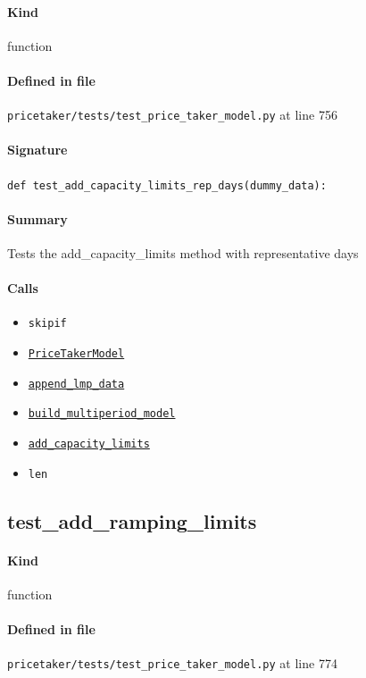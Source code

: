 \documentclass[11pt]{report}
\begin{document}
\paragraph{Kind} function
\paragraph{Defined in file} \texttt{pricetaker/tests/test\_price\_taker\_model.py} at line 756
\paragraph{Signature} \texttt{def test\_add\_capacity\_limits\_rep\_days(dummy\_data):}
\paragraph{Summary} Tests the add\_capacity\_limits method with representative days
\paragraph{Calls}
\begin{itemize}[leftmargin=*]
  \item \texttt{skipif}
  \item \hyperref[def:pricetaker-price_taker_model.py:PriceTakerModel:L161]{\texttt{PriceTakerModel}}
  \item \hyperref[def:pricetaker-price_taker_model.py:PriceTakerModel.append_lmp_data:L221]{\texttt{append\_lmp\_data}}
  \item \hyperref[def:pricetaker-price_taker_model.py:PriceTakerModel.build_multiperiod_model:L291]{\texttt{build\_multiperiod\_model}}
  \item \hyperref[def:pricetaker-price_taker_model.py:PriceTakerModel.add_capacity_limits:L654]{\texttt{add\_capacity\_limits}}
  \item \texttt{len}
\end{itemize}
\subsection{test\_add\_ramping\_limits}
\label{def:pricetaker-tests-test_price_taker_model.py:test_add_ramping_limits:L774}
\paragraph{Kind} function
\paragraph{Defined in file} \texttt{pricetaker/tests/test\_price\_taker\_model.py} at line 774
\end{document}
